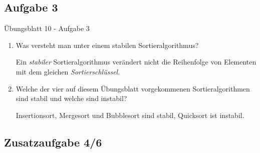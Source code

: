 \subsection{Aufgabe 3}
\begin{frame}[c,fragile]{Übungsblatt 10 - Aufgabe 3}
    \begin{enumerate}[<+(1)->]
        \itemsep7pt
        \item Was versteht man unter einem stabilen Sortieralgorithmus?\medskip\par
            \pause{} Ein \textit{stabiler} Sortieralgorithmus verändert nicht die Reihenfolge von Elementen mit dem gleichen \textit{Sortierschlüssel}. 
        \item Welche der vier auf diesem Übungsblatt vorgekommenen Sortieralgorithmen sind stabil und welche sind instabil?\medskip\par
        \pause Insertionsort, Mergesort und Bubblesort sind stabil, Quicksort ist instabil.\pause{} 
    \end{enumerate}
\end{frame}

\subsection{Zusatzaufgabe 4/6}


